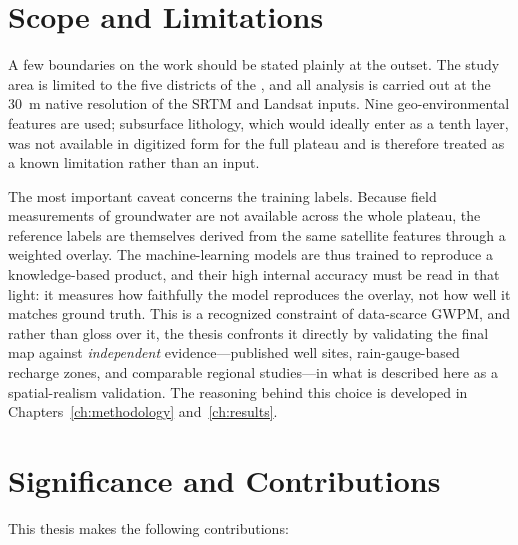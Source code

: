 \section{Scope and Limitations}
\label{sec:scope}

A few boundaries on the work should be stated plainly at the outset. The study
area is limited to the five districts of the \studyarea{}, and all analysis is
carried out at the 30~m native resolution of the SRTM and Landsat inputs. Nine
geo-environmental features are used; subsurface lithology, which would ideally
enter as a tenth layer, was not available in digitized form for the full
plateau and is therefore treated as a known limitation rather than an input.

The most important caveat concerns the training labels. Because field
measurements of groundwater are not available across the whole plateau, the
reference labels are themselves derived from the same satellite features through
a weighted overlay. The machine-learning models are thus trained to reproduce a
knowledge-based product, and their high internal accuracy must be read in that
light: it measures how faithfully the model reproduces the overlay, not how well
it matches ground truth. This is a recognized constraint of data-scarce GWPM,
and rather than gloss over it, the thesis confronts it directly by validating
the final map against \emph{independent} evidence---published well sites,
rain-gauge-based recharge zones, and comparable regional studies---in what is
described here as a spatial-realism validation. The reasoning behind this choice
is developed in Chapters~\ref{ch:methodology} and~\ref{ch:results}.

\section{Significance and Contributions}
\label{sec:significance}

This thesis makes the following contributions:


